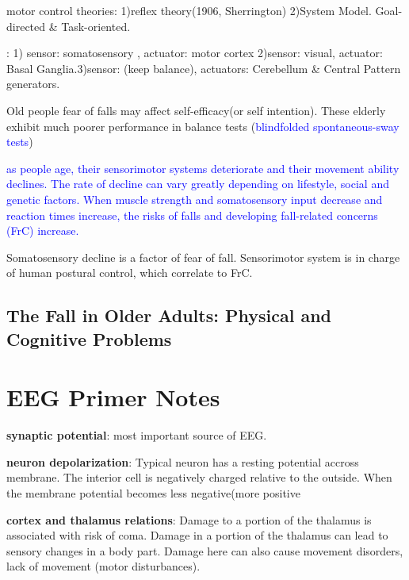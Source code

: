 \documentclass{article}
\begin{document}
\begin{description}[font=$\bullet$~\normalfont\textbf]
\item [Motor-control properties:]
motor control theories: 1)reflex theory(1906, Sherrington) 2)System Model. Goal-directed \& Task-oriented. 
\item [Systems involves in motor control]: 1) sensor: somatosensory , actuator: motor cortex 2)sensor: visual, actuator: Basal Ganglia.3)sensor: (keep balance), actuators: Cerebellum \& 	Central Pattern generators. 
\item [Fall-related concerns] Old people fear of falls may affect self-efficacy(or self intention). These elderly exhibit much poorer performance in balance tests \cite{Maki_1991} (\textcolor{blue}{blindfolded spontaneous-sway tests})
\end{description}

\textcolor{blue}{as people age, their sensorimotor systems deteriorate and their movement ability declines. The rate of decline can vary greatly depending on lifestyle, social and genetic factors. When muscle strength and somatosensory input decrease and reaction times increase, the risks of falls and developing fall-related concerns (FrC) increase.}

Somatosensory decline is a factor of fear of fall. Sensorimotor system is in charge of human postural control, which correlate to FrC. 
\subsection{The Fall in Older Adults: Physical and Cognitive Problems}
\cite{Laurence_2017}

\pagebreak

\section{EEG Primer Notes}

\textbf{synaptic potential}: most important source of EEG.

\textbf{neuron depolarization}: Typical neuron has a resting potential accross membrane. The interior cell is negatively charged relative to the outside. When the membrane potential becomes less negative(more positive

\textbf{cortex and thalamus relations}: 
Damage to a portion of the thalamus is associated with risk of coma. Damage in a portion of the thalamus can lead to sensory changes in a body part. Damage here can also cause movement disorders, lack of movement (motor disturbances).
\end{document}
